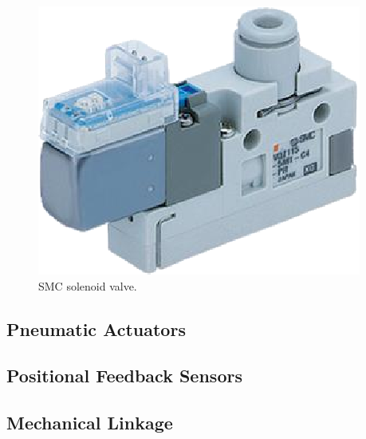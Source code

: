 \begin{figure}[H]
\centering

\includegraphics[scale=0.5]{implementation/figures/solenoid_valve.eps}
\caption{SMC solenoid valve.}
\label{fig:smc_solenoid_valve}
\end{figure}



\subsection{Pneumatic Actuators}


\subsection{Positional Feedback Sensors}


\subsection{Mechanical Linkage}
